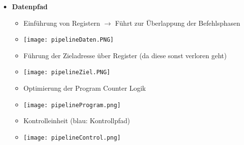 \begin{itemize}
        \item \textbf{Datenpfad}
            \begin{itemize}
                \item Einführung von Registern $\rightarrow$ Führt zur Überlappung der Befehlsphasen
                \item[] \texttt{[image: pipelineDaten.PNG]}
                \item Führung der Zieladresse über Register (da diese sonst verloren geht)
                \item[] \texttt{[image: pipelineZiel.PNG]}
                \item Optimierung der Program Counter Logik
                \item[] \texttt{[image: pipelineProgram.png]}
                \item Kontrolleinheit (blau: Kontrollpfad)
                \item[] \texttt{[image: pipelineControl.png]}  
            \end{itemize}
    \end{itemize}

\pagebreak

